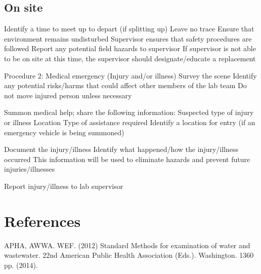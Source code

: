 \documentclass[12pt]{../SOP3_beta}
\begin{document}
\subsection{On site}

Identify a time to meet up to depart (if splitting up)
Leave no trace
Ensure that environment remains undisturbed
Supervisor ensures that safety procedures are followed
Report any potential field hazards to supervisor
If supervisor is not able to be on site at this time, the supervisor should designate/educate a replacement

Procedure 2: Medical emergency (Injury and/or illness)
Survey the scene
Identify any potential risks/harms that could affect other members of the lab team
Do not move injured person unless necessary

Summon medical help; share the following information:
Suspected type of injury or illness
Location
Type of assistance required
Identify a location for entry (if an emergency vehicle is being summoned)

Document the injury/illness
Identify what happened/how the injury/illness occurred
This information will be used to eliminate hazards and prevent future injuries/illnesses

Report injury/illness to lab supervisor


\section{References}

\NP APHA, AWWA. WEF. (2012) Standard Methods for examination of water and wastewater. 22nd American Public Health Association (Eds.). Washington. 1360 pp. (2014).
\end{document}
